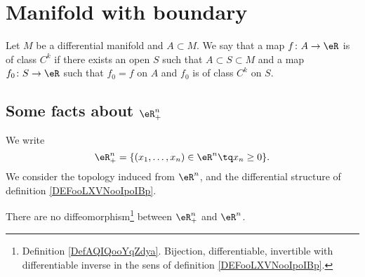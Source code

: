 \section{Manifold with boundary}


\begin{definition}	\label{DEFooLXVNooIpoIBp}
	Let \( M\) be a differential manifold and \( A\subset M\). We say that a map \(f \colon A\to \eR  \) is of class \( C^k\) if there exists an open \( S\) such that \( A\subset S\subset M\) and a map \(f_0 \colon S\to \eR  \) such that \( f_0=f\) on \( A\) and \( f_0\) is of class \( C^k\) on \( S\).
\end{definition}

\subsection{Some facts about \( \eR^n_+\)}

We write
\begin{equation}
	\eR_+^n=\{ (x_1,\ldots,x_n)\in \eR^n\tq x_n\geq 0 \}.
\end{equation}
We consider the topology induced from \( \eR^n\), and the differential structure of definition \ref{DEFooLXVNooIpoIBp}.


\begin{proposition}	\label{PROPooPUREooSkeyxs}
	There are no diffeomorphism\footnote{Definition \ref{DefAQIQooYqZdya}. Bijection, differentiable, invertible with differentiable inverse in the sens of definition \ref{DEFooLXVNooIpoIBp}.} between \( \eR^n_+\) and \( \eR^n\).
\end{proposition}

